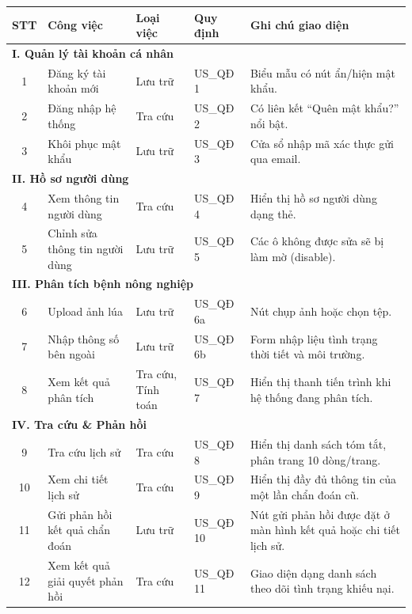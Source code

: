 \documentclass[12pt,a4paper]{article}
\begin{document}
\begin{longtable}{|c|p{3.5cm}|p{2cm}|p{2.5cm}|p{4.5cm}|}
\hline
\rowcolor{headerblue}
\textbf{STT} & \textbf{Công việc} & \textbf{Loại việc} & \textbf{Quy định} & \textbf{Ghi chú giao diện} \\
\hline
\endhead
\multicolumn{5}{|l|}{\cellcolor{notegreen}\textbf{I. Quản lý tài khoản cá nhân}} \\
\hline
1 & Đăng ký tài khoản mới & Lưu trữ & US\_QĐ 1 & Biểu mẫu có nút ẩn/hiện mật khẩu. \\
\hline
2 & Đăng nhập hệ thống & Tra cứu & US\_QĐ 2 & Có liên kết ``Quên mật khẩu?'' nổi bật. \\
\hline
3 & Khôi phục mật khẩu & Lưu trữ & US\_QĐ 3 & Cửa sổ nhập mã xác thực gửi qua email. \\
\hline
\multicolumn{5}{|l|}{\cellcolor{notegreen}\textbf{II. Hồ sơ người dùng}} \\
\hline
4 & Xem thông tin người dùng & Tra cứu & US\_QĐ 4 & Hiển thị hồ sơ người dùng dạng thẻ. \\
\hline
5 & Chỉnh sửa thông tin người dùng & Lưu trữ & US\_QĐ 5 & Các ô không được sửa sẽ bị làm mờ (disable). \\
\hline
\multicolumn{5}{|l|}{\cellcolor{notegreen}\textbf{III. Phân tích bệnh nông nghiệp}} \\
\hline
6 & Upload ảnh lúa & Lưu trữ & US\_QĐ 6a & Nút chụp ảnh hoặc chọn tệp. \\
\hline
7 & Nhập thông số bên ngoài & Lưu trữ & US\_QĐ 6b & Form nhập liệu tình trạng thời tiết và môi trường. \\
\hline
8 & Xem kết quả phân tích & Tra cứu, Tính toán & US\_QĐ 7 & Hiển thị thanh tiến trình khi hệ thống đang phân tích. \\
\hline
\multicolumn{5}{|l|}{\cellcolor{notegreen}\textbf{IV. Tra cứu \& Phản hồi}} \\
\hline
9 & Tra cứu lịch sử & Tra cứu & US\_QĐ 8 & Hiển thị danh sách tóm tắt, phân trang 10 dòng/trang. \\
\hline
10 & Xem chi tiết lịch sử & Tra cứu & US\_QĐ 9 & Hiển thị đầy đủ thông tin của một lần chẩn đoán cũ. \\
\hline
11 & Gửi phản hồi kết quả chẩn đoán & Lưu trữ & US\_QĐ 10 & Nút gửi phản hồi được đặt ở màn hình kết quả hoặc chi tiết lịch sử. \\
\hline
12 & Xem kết quả giải quyết phản hồi & Tra cứu & US\_QĐ 11 & Giao diện dạng danh sách theo dõi tình trạng khiếu nại. \\
\hline
\end{longtable}
\end{document}
